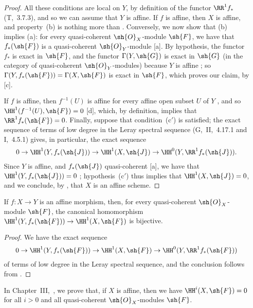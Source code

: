 \begin{proof}
All these conditions are local on $Y$, by definition of the functor $\RR^1 f_*$ (T,~3.7.3), and so we can assume that $Y$ is affine.
If $f$ is affine, then $X$ is affine, and property~(b) is nothing more than .
Conversely, we now show that (b) implies (a):
for every quasi-coherent $\sh{O}_X$-module $\sh{F}$, we have that $f_*(\sh{F})$ is a quasi-coherent $\sh{O}_Y$-module [a].
By hypothesis, the functor $f_*$ is exact in $\sh{F}$, and the functor $\Gamma(Y,\sh{G})$ is exact in $\sh{G}$ (in the category of quasi-coherent $\sh{O}_Y$-modules) because $Y$ is affine ;
so $\Gamma(Y,f_*(\sh{F}))=\Gamma(X,\sh{F})$ is exact in $\sh{F}$, which proves our claim, by [c].

If $f$ is affine, then $f^{-1}(U)$ is affine for every affine open subset $U$ of $Y$ , and so $\HH^1(f^{-1}(U),\sh{F})=0$ [d], which, by definition, implies that $\RR^1 f_*(\sh{F})=0$.
Finally, suppose that condition~(c$'$) is satisfied;
the exact sequence of terms of low degree in the Leray spectral sequence (G,~II,~4.17.1 and I,~4.5.1) gives, in particular, the exact sequence
\[
  0\to\HH^1(Y,f_*(\sh{J}))\to\HH^1(X,\sh{J})\to\HH^0(Y,\RR^1 f_*(\sh{J})).
\]
Since $Y$ is affine, and $f_*(\sh{J})$ quasi-coherent [a], we have that $\HH^1(Y,f_*(\sh{J}))=0$ ;
hypothesis~(c$'$) thus implies that $\HH^1(X,\sh{J})=0$, and we conclude, by , that $X$ is an affine scheme.
\end{proof}

\begin{corollary}[5.2.3]
\label{II.5.2.3}
If $f:X\to Y$ is an affine morphism, then, for every quasi-coherent $\sh{O}_X$-module $\sh{F}$, the canonical homomorphism $\HH^1(Y,f_*(\sh{F}))\to\HH^1(X,\sh{F})$ is bijective.
\end{corollary}

\begin{proof}
We have the exact sequence
\[
  0\to\HH^1(Y,f_*(\sh{F}))\to\HH^1(X,\sh{F})\to\HH^0(Y,\RR^1 f_*(\sh{F}))
\]
of terms of low degree in the Leray spectral sequence, and the conclusion follows from .
\end{proof}

\begin{remark}[5.2.4]
\label{II.5.2.4}
In Chapter~III,~, we prove that, if $X$ is affine, then we have $\HH^i(X,\sh{F})=0$ for all $i>0$ and all quasi-coherent $\sh{O}_X$-modules $\sh{F}$.
\end{remark}


